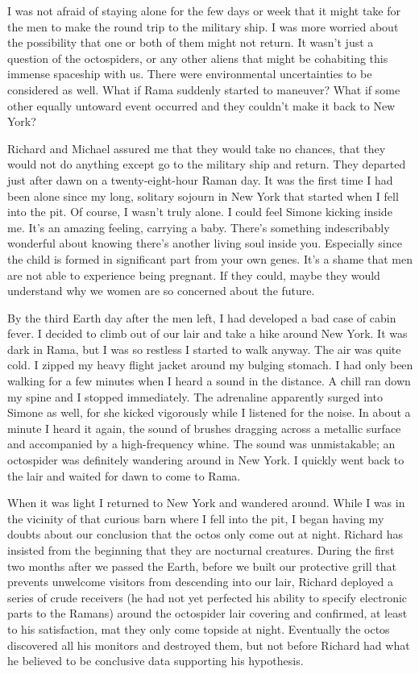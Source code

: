 \documentclass[]{article}
\begin{document}
I was not afraid of staying alone for the few days or week that it might take for the men to make the round trip to the military ship. I was more worried about the possibility that one or both of them might not return. It wasn’t just a question of the octospiders, or any other aliens that might be cohabiting this immense spaceship with us. There were environmental uncertainties to be considered as well. What if Rama suddenly started to maneuver? What if some other equally untoward event occurred and they couldn’t make it back to New York?

Richard and Michael assured me that they would take no chances, that they would not do anything except go to the military ship and return. They departed just after dawn on a twenty-eight-hour Raman day. It was the first time I had been alone since my long, solitary sojourn in New York that started when I fell into the pit. Of course, I wasn’t truly alone. I could feel Simone kicking inside me. It’s an amazing feeling, carrying a baby. There’s something indescribably wonderful about knowing there’s another living soul inside you. Especially since the child is formed in significant part from your own genes. It’s a shame that men are not able to experience being pregnant. If they could, maybe they would understand why we women are so concerned about the future.

By the third Earth day after the men left, I had developed a bad case of cabin fever. I decided to climb out of our lair and take a hike around New York. It was dark in Rama, but I was so restless I started to walk anyway. The air was quite cold. I zipped my heavy flight jacket around my bulging stomach. I had only been walking for a few minutes when I heard a sound in the distance. A chill ran down my spine and I stopped immediately. The adrenaline apparently surged into Simone as well, for she kicked vigorously while I listened for the noise. In about a minute I heard it again, the sound of brushes dragging across a metallic surface and accompanied by a high-frequency whine. The sound was unmistakable; an octospider was definitely wandering around in New York. I quickly went back to the lair and waited for dawn to come to Rama.

When it was light I returned to New York and wandered around. While I was in the vicinity of that curious barn where I fell into the pit, I began having my doubts about our conclusion that the octos only come out at night. Richard has insisted from the beginning that they are nocturnal creatures. During the first two months after we passed the Earth, before we built our protective grill that prevents unwelcome visitors from descending into our lair, Richard deployed a series of crude receivers (he had not yet perfected his ability to specify electronic parts to the Ramans) around the octospider lair covering and confirmed, at least to his satisfaction, mat they only come topside at night. Eventually the octos discovered all his monitors and destroyed them, but not before Richard had what he believed to be conclusive data supporting his hypothesis.
\end{document}
